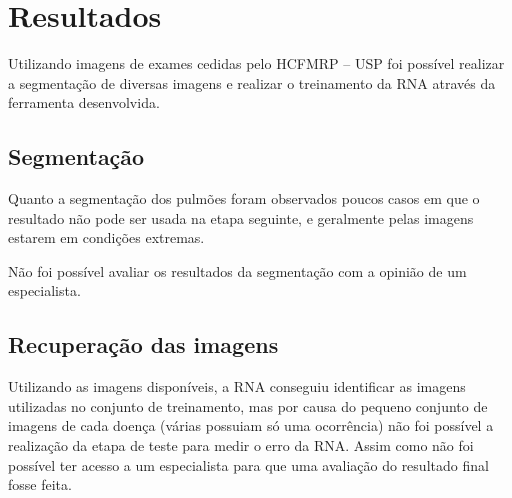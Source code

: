 \chapter{Resultados}

Utilizando imagens de exames cedidas pelo HCFMRP – USP foi possível realizar a segmentação de diversas imagens e realizar o treinamento da RNA através da ferramenta desenvolvida.

\section{Segmentação}

Quanto a segmentação dos pulmões foram observados poucos casos em que o resultado não pode ser usada na etapa seguinte, e geralmente pelas imagens estarem em condições extremas.

Não foi possível avaliar os resultados da segmentação com a opinião de um especialista.

\section{Recuperação das imagens}

Utilizando as imagens disponíveis, a RNA conseguiu identificar as imagens utilizadas no conjunto de treinamento, mas por causa do pequeno conjunto de imagens de cada doença (várias possuiam só uma ocorrência) não foi possível a realização da etapa de teste para medir o erro da RNA. Assim como não foi possível ter acesso a um especialista para que uma avaliação do resultado final fosse feita.